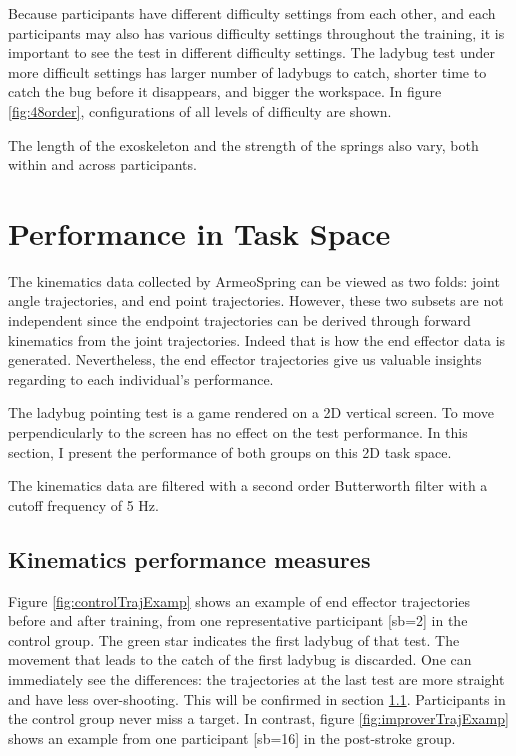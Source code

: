 Because participants have different difficulty settings from each other, and each participants may also has various difficulty settings throughout the training, it is important to see the test in different difficulty settings. 
The ladybug test under more difficult settings has larger number of ladybugs to catch, shorter time to catch the bug before it disappears, and bigger the workspace. 
In figure \ref{fig:48order}, configurations of all levels of difficulty are shown. 

The length of the exoskeleton and the strength of the springs also vary, both within and across participants.


\section{Performance in Task Space}

The kinematics data collected by ArmeoSpring can be viewed as two folds: joint angle trajectories, and end point trajectories. 
However, these two subsets are not independent since the endpoint trajectories can be derived through forward kinematics from the joint trajectories. 
Indeed that is how the end effector data is generated. 
Nevertheless, the end effector trajectories give us valuable insights regarding to each individual's performance.

The ladybug pointing test is a game rendered on a 2D vertical screen. 
To move perpendicularly to the screen has no effect on the test performance. 
In this section, I present the performance of both groups on this 2D task space.

The kinematics data are filtered with a second order Butterworth filter with a cutoff frequency of 5 Hz.

\subsection{Kinematics performance measures}

Figure \ref{fig:controlTrajExamp} shows an example of end effector trajectories before and after training, from one representative participant [sb=2] in the control group. 
The green star indicates the first ladybug of that test. 
The movement that leads to the catch of the first ladybug is discarded. 
One can immediately see the differences: the trajectories at the last test are more straight and have less over-shooting. 
This will be confirmed in section \ref{}. 
Participants in the control group never miss a target.
In contrast, figure \ref{fig:improverTrajExamp} shows an example from one participant [sb=16] in the post-stroke group. 

